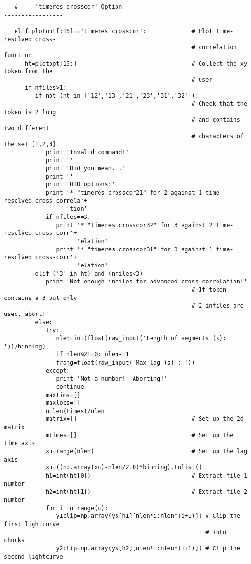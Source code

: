 \begin{verbatim}
   #-----'timeres crosscor' Option-----------------------------------------------------

   elif plotopt[:16]=='timeres crosscor':             # Plot time-resolved cross-
                                                      # correlation function
      ht=plotopt[16:]                                 # Collect the xy token from the
                                                      # user
      if nfiles>1:
         if not (ht in ['12','13','21','23','31','32']):
                                                      # Check that the token is 2 long
                                                      # and contains two different
                                                      # characters of the set [1,2,3]
            print 'Invalid command!'
            print ''
            print 'Did you mean...'
            print ''
            print 'HID options:'
            print '* "timeres crosscor21" for 2 against 1 time-resolved cross-correla'+
                  'tion'
            if nfiles==3:
               print '* "timeres crosscor32" for 3 against 2 time-resolved cross-corr'+
                     'elation'
               print '* "timeres crosscor31" for 3 against 1 time-resolved cross-corr'+
                     'elation'
         elif ('3' in ht) and (nfiles<3)
            print 'Not enough infiles for advanced cross-correlation!'
                                                      # If token contains a 3 but only
                                                      # 2 infiles are used, abort!
         else:
            try:
               nlen=int(float(raw_input('Length of segments (s): '))/binning)
               if nlen%2!=0: nlen-=1
               frang=float(raw_input('Max lag (s) : '))
            except:
               print 'Not a number!  Aborting!'
               continue
            maxtims=[]
            maxlocs=[]
            n=len(times)/nlen
            matrix=[]                                 # Set up the 2d matrix
            mtimes=[]                                 # Set up the time axis
            xn=range(nlen)                            # Set up the lag axis
            xn=((np.array(xn)-nlen/2.0)*binning).tolist()
            h1=int(ht[0])                             # Extract file 1 number
            h2=int(ht[1])                             # Extract file 2 number
            for i in range(n):
               y1clip=np.array(ys[h1][nlen*i:nlen*(i+1)]) # Clip the first lightcurve
                                                          # into chunks
               y2clip=np.array(ys[h2][nlen*i:nlen*(i+1)]) # Clip the second lightcurve

\end{verbatim}
